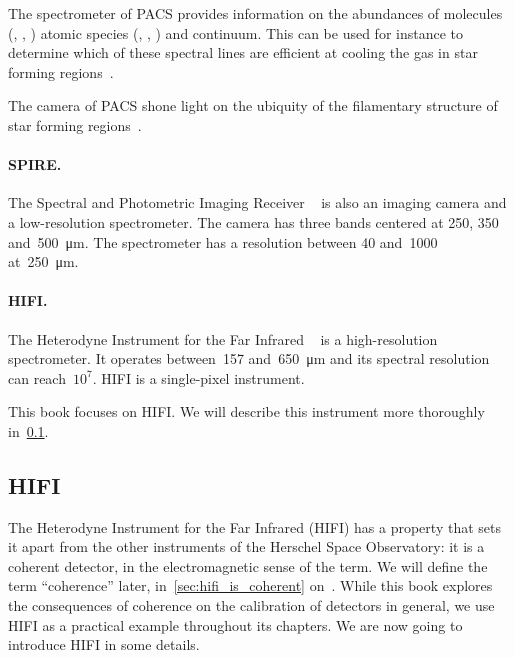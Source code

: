 The spectrometer of PACS provides information on the abundances of molecules
(, , ) atomic species (, , ) and continuum.
This can be used for instance to determine which of these spectral lines are efficient at cooling the gas in star forming regions~\cite{2013A&A...552A.141K}.

The camera of PACS shone light on the ubiquity of the filamentary structure of star forming regions~\cite{2010A&A...518L.100M}.



\paragraph{SPIRE.}The Spectral and Photometric Imaging Receiver%
~\cite{griffin2010herschel}
is also an imaging camera and a low-resolution spectrometer.
The camera has three bands centered at \num{250}, \num{350} and~\SI{500}{\micro\meter}.
The spectrometer has a resolution between \num{40} and~\num{1000} at~\SI{250}{\micro\meter}.


\paragraph{HIFI.}The Heterodyne Instrument for the Far Infrared%
~\cite{AA_537_A17}
is a high-resolution spectrometer.
It operates between~\num{157} and~\SI{650}{\micro\meter} and its spectral resolution can reach~$10^7$.
HIFI is a single-pixel instrument.

This book focuses on HIFI.
We will describe this instrument more thoroughly in~\cref{sec:HIFI}.



\subsection{HIFI}
\label{sec:HIFI}

The Heterodyne Instrument for the Far Infrared (HIFI) has a property that sets it apart from the other instruments of the Herschel Space Observatory: it is a coherent detector, in the electromagnetic sense of the term.
We will define the term ``coherence'' later,
in~\cref{sec:hifi_is_coherent}
on~.
While this book explores the consequences of coherence on the calibration of detectors in general, we use HIFI as a practical example throughout its chapters.
We are now going to introduce HIFI in some details.



